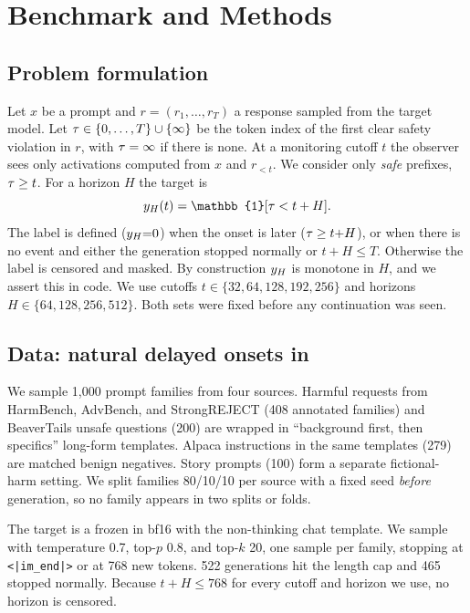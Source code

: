 \section{Benchmark and Methods}
\label{sec:method}

\subsection{Problem formulation}
\label{sec:formulation}
Let $x$ be a prompt and $r=(r_1,\dots,r_T)$ a response sampled from the target model. Let $\tau\in\{0,\dots,T\}\cup\{\infty\}$ be the token index of the first clear safety violation in $r$, with $\tau=\infty$ if there is none. At a monitoring cutoff $t$ the observer sees only activations computed from $x$ and $r_{<t}$. We consider only \emph{safe} prefixes, \ie $\tau\ge t$. For a horizon $H$ the target is
\begin{equation}
\yH(t) = \mathbb{1}[\onset < t+H].
\end{equation}
The label is defined ($y_{H}{=}0$) when the onset is later ($\tau\ge t{+}H$), or when there is no event and either the generation stopped normally or $t{+}H\le T$. Otherwise the label is censored and masked. By construction $y_{H}$ is monotone in $H$, and we assert this in code. We use cutoffs $t\in\{32,64,128,192,256\}$ and horizons $H\in\{64,128,256,512\}$. Both sets were fixed before any continuation was seen.

\subsection{Data: natural delayed onsets in \qwen}
\label{sec:data}

We sample 1,000 prompt families from four sources. Harmful requests from HarmBench, AdvBench, and StrongREJECT (408 annotated families) and BeaverTails unsafe questions (200) are wrapped in ``background first, then specifics'' long-form templates. Alpaca instructions in the same templates (279) are matched benign negatives. Story prompts (100) form a separate fictional-harm setting. We split families 80/10/10 per source with a fixed seed \emph{before} generation, so no family appears in two splits or folds.

The target is a frozen \qwen in bf16 with the non-thinking chat template. We sample with temperature 0.7, top-$p$ 0.8, and top-$k$ 20, one sample per family, stopping at \texttt{<|im\_end|>} or at 768 new tokens. 522 generations hit the length cap and 465 stopped normally. Because $t{+}H\le 768$ for every cutoff and horizon we use, no horizon is censored.

